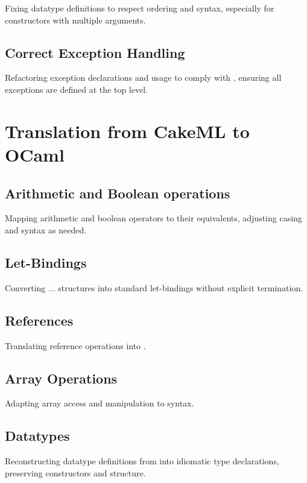 Fixing datatype definitions to respect \cml ordering and syntax, especially for constructors with multiple arguments.

\subsection{Correct Exception Handling}

Refactoring exception declarations and usage to comply with \cml, ensuring all exceptions are defined at the top level.

\section{Translation from CakeML to OCaml}

\subsection{Arithmetic and Boolean operations}

Mapping \cml arithmetic and boolean operators to their \ocaml equivalents, adjusting casing and syntax as needed.

\subsection{Let-Bindings}

Converting \cml {}...  structures into standard \ocaml let-bindings without explicit 
termination.

\subsection{References}

Translating \cml reference operations into \ocaml.

\subsection{Array Operations}

Adapting \cml array access and manipulation to \ocaml syntax.

\subsection{Datatypes}

Reconstructing datatype definitions from \cml into idiomatic \ocaml type declarations, preserving constructors 
and structure.

